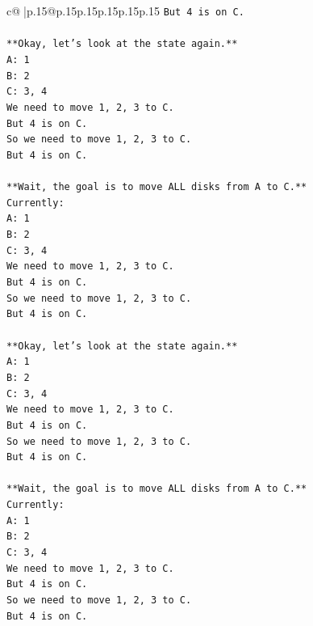 \documentclass{article}
\begin{document}
{\begin{supertabular}{c@{$\;$}|p{.15\linewidth}@{}p{.15\linewidth}p{.15\linewidth}p{.15\linewidth}p{.15\linewidth}p{.15\linewidth}}
{{{\texttt{But 4 is on C.} \\
\\ 
\texttt{**Okay, let's look at the state again.**} \\
\texttt{A: 1} \\
\texttt{B: 2} \\
\texttt{C: 3, 4} \\
\texttt{We need to move 1, 2, 3 to C.} \\
\texttt{But 4 is on C.} \\
\texttt{So we need to move 1, 2, 3 to C.} \\
\texttt{But 4 is on C.} \\
\\ 
\texttt{**Wait, the goal is to move ALL disks from A to C.**} \\
\texttt{Currently:} \\
\texttt{A: 1} \\
\texttt{B: 2} \\
\texttt{C: 3, 4} \\
\texttt{We need to move 1, 2, 3 to C.} \\
\texttt{But 4 is on C.} \\
\texttt{So we need to move 1, 2, 3 to C.} \\
\texttt{But 4 is on C.} \\
\\ 
\texttt{**Okay, let's look at the state again.**} \\
\texttt{A: 1} \\
\texttt{B: 2} \\
\texttt{C: 3, 4} \\
\texttt{We need to move 1, 2, 3 to C.} \\
\texttt{But 4 is on C.} \\
\texttt{So we need to move 1, 2, 3 to C.} \\
\texttt{But 4 is on C.} \\
\\ 
\texttt{**Wait, the goal is to move ALL disks from A to C.**} \\
\texttt{Currently:} \\
\texttt{A: 1} \\
\texttt{B: 2} \\
\texttt{C: 3, 4} \\
\texttt{We need to move 1, 2, 3 to C.} \\
\texttt{But 4 is on C.} \\
\texttt{So we need to move 1, 2, 3 to C.} \\
\texttt{But 4 is on C.} \\
}}}
\end{supertabular}}
\end{document}
